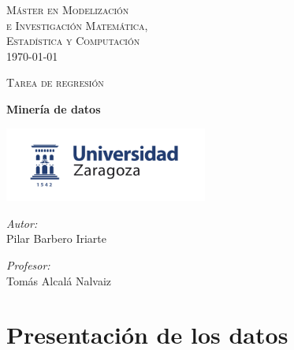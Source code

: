\documentclass[a4paper,12pt]{article}
\author{Pilar Barbero Iriarte}
\begin{document}



\begin{titlepage}
\begin{center}



\textsc{\LARGE M\'aster en Modelizaci\'on \\e Investigaci\'on Matem\'atica,\\ Estad\'istica y Computaci\'on }\\[1.5cm]
{\large \today}

\textsc{Tarea de regresi\'on}\\[0.5cm]

\vfill

{ \huge \bfseries Miner\'ia de datos \\[0.4cm] }

\includegraphics[width=0.5\textwidth]{logoUZ.png}~\\[1cm]

\noindent
\begin{minipage}{0.4\textwidth}
\begin{flushleft} \large
\emph{Autor:}\\
Pilar Barbero Iriarte
\end{flushleft}
\end{minipage}%
\begin{minipage}{0.4\textwidth}
\begin{flushright} \large
\emph{Profesor:} \\
Tom\'as Alcal\'a Nalvaiz
\end{flushright}
\end{minipage}

\end{center}


\end{titlepage}

\pagebreak
\tableofcontents
\pagebreak


\section{Presentaci\'on de los datos}
\end{document}
